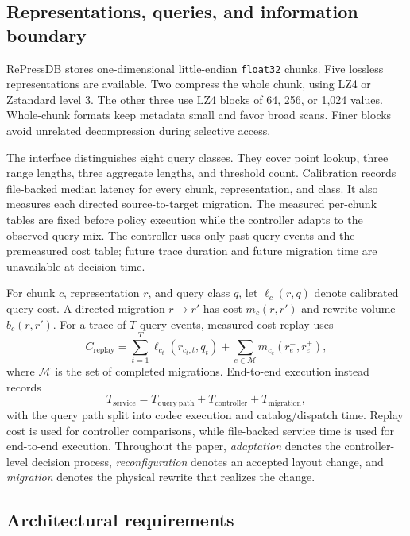\documentclass[final,5p,times,twocolumn,authoryear]{elsarticle}
\begin{document}
\subsection{Representations, queries, and information boundary}

RePressDB stores one-dimensional little-endian \texttt{float32} chunks. Five lossless representations are available. Two compress the whole chunk, using LZ4 or Zstandard level 3. The other three use LZ4 blocks of 64, 256, or 1,024 values. Whole-chunk formats keep metadata small and favor broad scans. Finer blocks avoid unrelated decompression during selective access.

The interface distinguishes eight query classes. They cover point lookup, three range lengths, three aggregate lengths, and threshold count. Calibration records file-backed median latency for every chunk, representation, and class. It also measures each directed source-to-target migration. The measured per-chunk tables are fixed before policy execution while the controller adapts to the observed query mix. The controller uses only past query events and the premeasured cost table; future trace duration and future migration time are unavailable at decision time.

For chunk $c$, representation $r$, and query class $q$, let $\ell_c(r,q)$ denote calibrated query cost. A directed migration $r\rightarrow r'$ has cost $m_c(r,r')$ and rewrite volume $b_c(r,r')$. For a trace of $T$ query events, measured-cost replay uses
\begin{equation}
C_{\mathrm{replay}}=
\sum_{t=1}^{T}\ell_{c_t}(r_{c_t,t},q_t)
+\sum_{e\in\mathcal{M}}m_{c_e}(r^-_e,r^+_e),
\label{eq:replay_cost}
\end{equation}
where $\mathcal{M}$ is the set of completed migrations. End-to-end execution instead records
\begin{equation}
T_{\mathrm{service}}=
T_{\mathrm{query\ path}}+T_{\mathrm{controller}}+T_{\mathrm{migration}},
\label{eq:e2e_cost}
\end{equation}
with the query path split into codec execution and catalog/dispatch time. Replay cost is used for controller comparisons, while file-backed service time is used for end-to-end execution. Throughout the paper, \emph{adaptation} denotes the controller-level decision process, \emph{reconfiguration} denotes an accepted layout change, and \emph{migration} denotes the physical rewrite that realizes the change.

\subsection{Architectural requirements}
\end{document}
